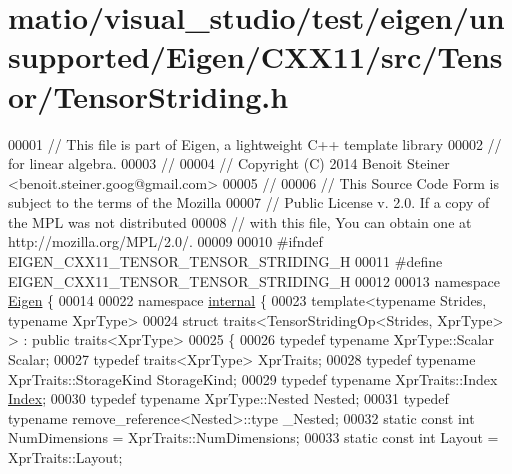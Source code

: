 \hypertarget{matio_2visual__studio_2test_2eigen_2unsupported_2_eigen_2_c_x_x11_2src_2_tensor_2_tensor_striding_8h_source}{}\section{matio/visual\+\_\+studio/test/eigen/unsupported/\+Eigen/\+C\+X\+X11/src/\+Tensor/\+Tensor\+Striding.h}
\label{matio_2visual__studio_2test_2eigen_2unsupported_2_eigen_2_c_x_x11_2src_2_tensor_2_tensor_striding_8h_source}

\begin{DoxyCode}
00001 \textcolor{comment}{// This file is part of Eigen, a lightweight C++ template library}
00002 \textcolor{comment}{// for linear algebra.}
00003 \textcolor{comment}{//}
00004 \textcolor{comment}{// Copyright (C) 2014 Benoit Steiner <benoit.steiner.goog@gmail.com>}
00005 \textcolor{comment}{//}
00006 \textcolor{comment}{// This Source Code Form is subject to the terms of the Mozilla}
00007 \textcolor{comment}{// Public License v. 2.0. If a copy of the MPL was not distributed}
00008 \textcolor{comment}{// with this file, You can obtain one at http://mozilla.org/MPL/2.0/.}
00009 
00010 \textcolor{preprocessor}{#ifndef EIGEN\_CXX11\_TENSOR\_TENSOR\_STRIDING\_H}
00011 \textcolor{preprocessor}{#define EIGEN\_CXX11\_TENSOR\_TENSOR\_STRIDING\_H}
00012 
00013 \textcolor{keyword}{namespace }\hyperlink{namespace_eigen}{Eigen} \{
00014 
00022 \textcolor{keyword}{namespace }\hyperlink{namespaceinternal}{internal} \{
00023 \textcolor{keyword}{template}<\textcolor{keyword}{typename} Str\textcolor{keywordtype}{id}es, \textcolor{keyword}{typename} XprType>
00024 \textcolor{keyword}{struct }traits<TensorStridingOp<Strides, XprType> > : \textcolor{keyword}{public} traits<XprType>
00025 \{
00026   \textcolor{keyword}{typedef} \textcolor{keyword}{typename} XprType::Scalar Scalar;
00027   \textcolor{keyword}{typedef} traits<XprType> XprTraits;
00028   \textcolor{keyword}{typedef} \textcolor{keyword}{typename} XprTraits::StorageKind StorageKind;
00029   \textcolor{keyword}{typedef} \textcolor{keyword}{typename} XprTraits::Index \hyperlink{namespace_eigen_a62e77e0933482dafde8fe197d9a2cfde}{Index};
00030   \textcolor{keyword}{typedef} \textcolor{keyword}{typename} XprType::Nested Nested;
00031   \textcolor{keyword}{typedef} \textcolor{keyword}{typename} remove\_reference<Nested>::type \_Nested;
00032   \textcolor{keyword}{static} \textcolor{keyword}{const} \textcolor{keywordtype}{int} NumDimensions = XprTraits::NumDimensions;
00033   \textcolor{keyword}{static} \textcolor{keyword}{const} \textcolor{keywordtype}{int} Layout = XprTraits::Layout;

\end{DoxyCode}
